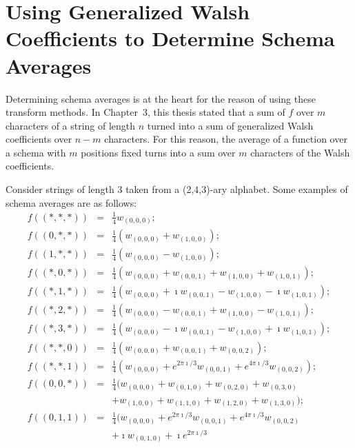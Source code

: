 \typeout{}

\chapter{Using Generalized Walsh Coefficients to Determine Schema Averages}
Determining schema averages is at the heart for the reason of using these
transform methods.  
In Chapter~3, this thesis stated that a sum of $f$ over $m$ 
characters
of a string of length $n$ turned into a sum of generalized Walsh
coefficients over $n-m$ characters.  For this reason, the average of a function
over a schema with $m$ positions fixed turns into a sum over $m$ characters
of the Walsh coefficients.

\begin{example} Consider strings of length 3 taken from a (2,4,3)-ary alphabet.
Some examples of schema averages are as follows:
\begin{eqnarray}
f((*,*,*)) &=& \frac{1}{4} w_{(0,0,0)}; \nonumber \\
f((0,*,*)) &=& \frac{1}{4} (w_{(0,0,0)}+w_{(1,0,0)}); \nonumber \\
f((1,*,*)) &=& \frac{1}{4} (w_{(0,0,0)}-w_{(1,0,0)}); \nonumber \\
f((*,0,*)) &=& \frac{1}{4} (w_{(0,0,0)}+
				w_{(0,0,1)}+
				w_{(1,0,0)}+
				w_{(1,0,1)}); \nonumber \\
f((*,1,*)) &=& \frac{1}{4} (w_{(0,0,0)}+ \imath w_{(0,0,1)}-
				w_{(1,0,0)}-\imath w_{(1,0,1)}); \nonumber \\
f((*,2,*)) &=& \frac{1}{4} (w_{(0,0,0)}- w_{(0,0,1)}+
				w_{(1,0,0)}- w_{(1,0,1)}); \nonumber \\
f((*,3,*)) &=& \frac{1}{4} (w_{(0,0,0)}- \imath w_{(0,0,1)}-
				w_{(1,0,0)}+\imath w_{(1,0,1)}); \nonumber \\
f((*,*,0)) &=& \frac{1}{4} (w_{(0,0,0)}+w_{(0,0,1)}+w_{(0,0,2)}); \nonumber\\
f((*,*,1)) &=& \frac{1}{4} (w_{(0,0,0)}+e^{2\pi\imath/3} w_{(0,0,1)}
		+ e^{4\pi\imath/3} w_{(0,0,2)}); \nonumber\\
f((0,0,*)) &=& \frac{1}{4} (w_{(0,0,0)}+ w_{(0,1,0)}+
				w_{(0,2,0)}+ w_{(0,3,0)}
	\nonumber\\
	&&+
				w_{(1,0,0)}+ w_{(1,1,0)}+
				w_{(1,2,0)}+ w_{(1,3,0)}); \nonumber \\
f((0,1,1)) &=& \frac{1}{4} (
w_{(0,0,0)} + e^{2\pi\imath/3} w_{(0,0,1)}+ e^{4\pi\imath/3} w_{(0,0,2)} 
	\nonumber\\
 && + \imath w_{(0,1,0)} + \imath e^{2\pi\imath/3} 

\end{eqnarray}
\end{example}
